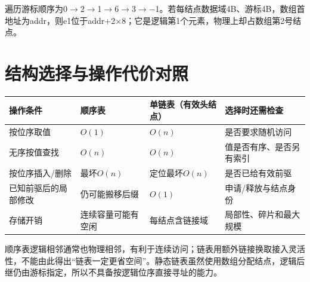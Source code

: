 遍历游标顺序为0\ensuremath{\to}2\ensuremath{\to}1\ensuremath{\to}6\ensuremath{\to}3\ensuremath{\to}\ensuremath{-}1。若每结点数据域4B、游标4B，数组首地址为addr，则e1位于addr+2\ensuremath{\times}8；它是逻辑第1个元素，物理上却占数组第2号结点。

\section{结构选择与操作代价对照}\label{DS02-compare}

\begin{wideblock}

\par\medskip\noindent\begin{minipage}{\linewidth}\fontsize{9.3}{12}\selectfont\begin{tabularx}{\linewidth}{@{}YYYY@{}}
\toprule\noalign{}
\begin{minipage}[b]{\linewidth}\raggedright
操作条件
\end{minipage} & \begin{minipage}[b]{\linewidth}\raggedright
顺序表
\end{minipage} & \begin{minipage}[b]{\linewidth}\raggedright
单链表（有效头结点）
\end{minipage} & \begin{minipage}[b]{\linewidth}\raggedright
选择时还需检查
\end{minipage} \\
\midrule\noalign{}


按位序取值 & \(O(1)\) & \(O(n)\) & 是否要求随机访问 \\
无序按值查找 & \(O(n)\) & \(O(n)\) & 值是否有序、是否另有索引 \\
按位序插入/删除 & 最坏\(O(n)\) & 定位最坏\(O(n)\) & 是否已给有效前驱 \\
已知前驱后的局部修改 & 仍可能搬移后缀 & \(O(1)\) & 申请/释放与结点身份 \\
存储开销 & 连续容量可能有空闲 & 每结点含链接域 & 局部性、碎片和最大规模 \\
\bottomrule\end{tabularx}
\end{minipage}\par\medskip

\end{wideblock}

顺序表逻辑相邻通常也物理相邻，有利于连续访问；链表用额外链接换取接入灵活性，不能由此得出``链表一定更省空间''。静态链表虽然使用数组分配结点，逻辑后继仍由游标指定，所以不具备按逻辑位序直接寻址的能力。

